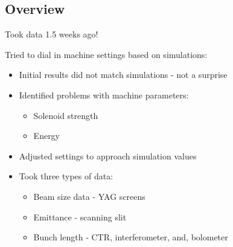 \documentclass[professionalfonts,t]{beamer}
\begin{document}
\subsection{Overview}
\begin{frame}
Took data 1.5 weeks ago!

Tried to dial in machine settings based on simulations:
\begin{itemize}
	\item Initial results did not match simulations - not a surprise
	\item Identified problems with machine parameters:
	\begin{itemize}
		\item Solenoid strength
		\item Energy 
	\end{itemize}
	
	
	\item Adjusted settings to approach simulation values
	\item Took three types of data:
	\begin{itemize}
		\item Beam size data - YAG screens
		\item Emittance - scanning slit
		\item Bunch length - CTR, interferometer, and, bolometer 
	\end{itemize}
\end{itemize}

\end{frame}
\end{document}
